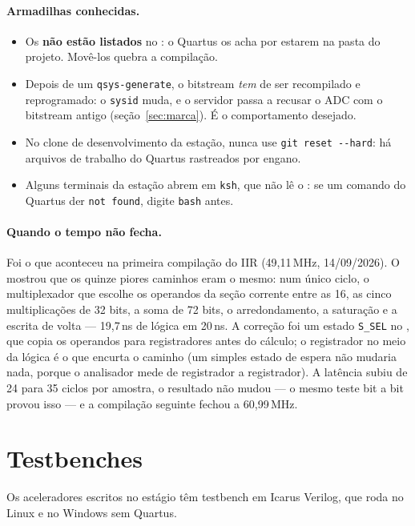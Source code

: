 \paragraph{Armadilhas conhecidas.}
\begin{itemize}
  \item Os  \textbf{não estão listados} no : o Quartus
    os acha por estarem na pasta do projeto. Movê-los quebra a compilação.
  \item Depois de um \texttt{qsys-generate}, o bitstream \emph{tem} de ser
    recompilado e reprogramado: o \texttt{sysid} muda, e o servidor passa a
    recusar o ADC com o bitstream antigo (seção~\ref{sec:marca}). É o
    comportamento desejado.
  \item No clone de desenvolvimento da estação, nunca use
    \texttt{git reset -{}-hard}: há arquivos de trabalho do Quartus rastreados
    por engano.
  \item Alguns terminais da estação abrem em \texttt{ksh}, que não lê o
    : se um comando do Quartus der \texttt{not found}, digite
    \texttt{bash} antes.
\end{itemize}

\paragraph{Quando o tempo não fecha.} Foi o que aconteceu na primeira
compilação do IIR (49,11\,MHz, 14/09/2026). O 
mostrou que os quinze piores caminhos eram o mesmo: num único ciclo, o
multiplexador que escolhe os operandos da seção corrente entre as 16, as cinco
multiplicações de 32 bits, a soma de 72 bits, o arredondamento, a saturação e a
escrita de volta --- 19,7\,ns de lógica em 20\,ns. A correção foi um estado
\texttt{S\_SEL} no , que copia os operandos para
registradores antes do cálculo; o registrador no meio da lógica é o que
encurta o caminho (um simples estado de espera não mudaria nada, porque o
analisador mede de registrador a registrador). A latência subiu de 24 para 35
ciclos por amostra, o resultado não mudou --- o mesmo teste bit a bit provou
isso --- e a compilação seguinte fechou a 60,99\,MHz.

\section{Testbenches}
\label{sec:testbenches}

Os aceleradores escritos no estágio têm testbench em Icarus Verilog, que roda
no Linux e no Windows sem Quartus.

